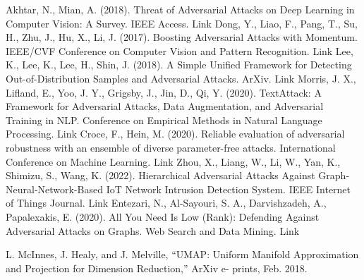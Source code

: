 \documentclass[10pt, conference, a4paper, final]{IEEEtran}
\begin{document}
\begin{thebibliography}{01}
    Akhtar, N., Mian, A. (2018). Threat of Adversarial Attacks on Deep Learning in Computer Vision: A Survey. IEEE Access. Link
    Dong, Y., Liao, F., Pang, T., Su, H., Zhu, J., Hu, X.,  Li, J. (2017). Boosting Adversarial Attacks with Momentum. IEEE/CVF Conference on Computer Vision and Pattern Recognition. Link
    Lee, K., Lee, K., Lee, H.,  Shin, J. (2018). A Simple Unified Framework for Detecting Out-of-Distribution Samples and Adversarial Attacks. ArXiv. Link
    Morris, J. X., Lifland, E., Yoo, J. Y., Grigsby, J., Jin, D.,  Qi, Y. (2020). TextAttack: A Framework for Adversarial Attacks, Data Augmentation, and Adversarial Training in NLP. Conference on Empirical Methods in Natural Language Processing. Link
    Croce, F., Hein, M. (2020). Reliable evaluation of adversarial robustness with an ensemble of diverse parameter-free attacks. International Conference on Machine Learning. Link
    Zhou, X., Liang, W., Li, W., Yan, K., Shimizu, S.,  Wang, K. (2022). Hierarchical Adversarial Attacks Against Graph-Neural-Network-Based IoT Network Intrusion Detection System. IEEE Internet of Things Journal. Link
    Entezari, N., Al-Sayouri, S. A., Darvishzadeh, A.,  Papalexakis, E. (2020). All You Need Is Low (Rank): Defending Against Adversarial Attacks on Graphs. Web Search and Data Mining. Link

	L. McInnes, J. Healy, and J. Melville, “UMAP: Uniform Manifold Approximation and Projection for Dimension Reduction,” ArXiv e- prints, Feb. 2018.
   

\end{thebibliography}
\end{document}
